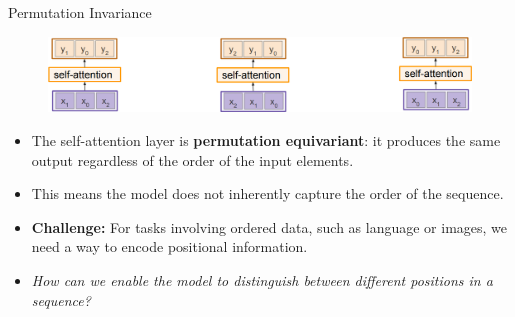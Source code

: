 \begin{frame}[allowframebreaks]{Permutation Invariance}
    \begin{figure}
        \centering
        \includegraphics[width=\linewidth,height=\textheight,keepaspectratio]{images/transformers/slide_44_1_img.png}
    \end{figure}

    \vspace{1em}

    \begin{itemize}
        \item The self-attention layer is \textbf{permutation equivariant}: it produces the same output regardless of the order of the input elements.
        \item This means the model does not inherently capture the order of the sequence.
        \item \textbf{Challenge:} For tasks involving ordered data, such as language or images, we need a way to encode positional information.
        \item \textit{How can we enable the model to distinguish between different positions in a sequence?}
    \end{itemize}
\end{frame}